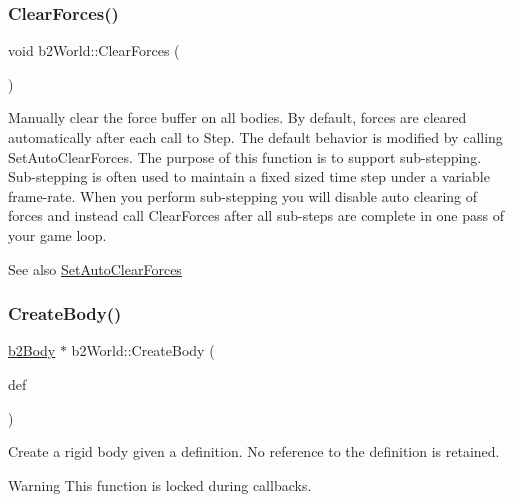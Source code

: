 \subsubsection{\texorpdfstring{Clear\+Forces()}{ClearForces()}\hspace{0.1cm}{\footnotesize\ttfamily [2/2]}}
{\footnotesize\ttfamily void b2\+World\+::\+Clear\+Forces (\begin{DoxyParamCaption}{ }\end{DoxyParamCaption})}

Manually clear the force buffer on all bodies. By default, forces are cleared automatically after each call to Step. The default behavior is modified by calling Set\+Auto\+Clear\+Forces. The purpose of this function is to support sub-\/stepping. Sub-\/stepping is often used to maintain a fixed sized time step under a variable frame-\/rate. When you perform sub-\/stepping you will disable auto clearing of forces and instead call Clear\+Forces after all sub-\/steps are complete in one pass of your game loop. \begin{DoxySeeAlso}{See also}
\hyperlink{classb2World_aa2bced28ddef5bbb00ed5666e5e9f620}{Set\+Auto\+Clear\+Forces} 
\end{DoxySeeAlso}
\mbox{\label{classb2World_a2eb36e967e43294bfa03ec3d177c2dae}} 
\subsubsection{\texorpdfstring{Create\+Body()}{CreateBody()}\hspace{0.1cm}{\footnotesize\ttfamily [1/2]}}
{\footnotesize\ttfamily \hyperlink{classb2Body}{b2\+Body} $\ast$ b2\+World\+::\+Create\+Body (\begin{DoxyParamCaption}\item[{const \hyperlink{structb2BodyDef}{b2\+Body\+Def} $\ast$}]{def }\end{DoxyParamCaption})}

Create a rigid body given a definition. No reference to the definition is retained. \begin{DoxyWarning}{Warning}
This function is locked during callbacks. 
\end{DoxyWarning}
\mbox{\label{classb2World_a9323d553e4c132b26d8741b457d7c034}} 
